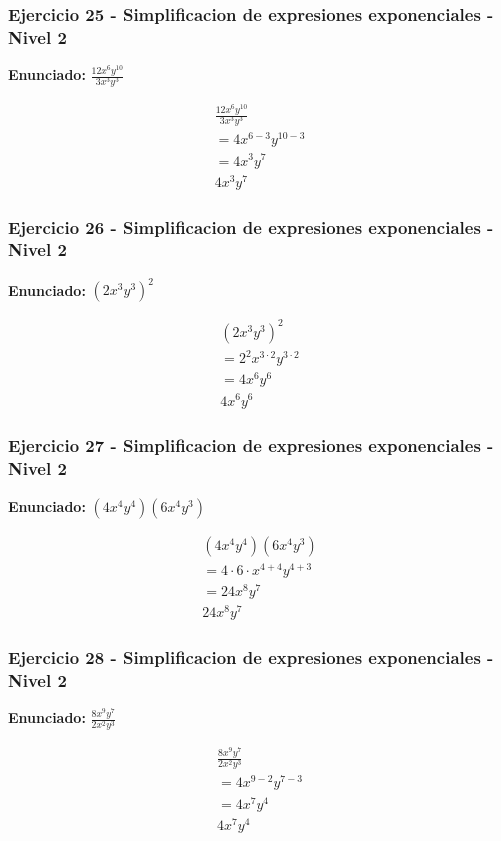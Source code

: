 \documentclass[12pt,a4paper]{article}
\begin{document}
\subsubsection*{Ejercicio 25 - Simplificacion de expresiones exponenciales - Nivel 2}
\textbf{Enunciado:} \(\frac{12x^{6}y^{10}}{3x^{3}y^{3}}\)

\[
\begin{aligned}
\frac{12x^{6}y^{10}}{3x^{3}y^{3}}\\
=4x^{6-3}y^{10-3}\\
=4x^{3}y^{7}\\
\boxed{4x^{3}y^{7}}
\end{aligned}
\]


\subsubsection*{Ejercicio 26 - Simplificacion de expresiones exponenciales - Nivel 2}
\textbf{Enunciado:} \(\left(2x^{3}y^{3}\right)^{2}\)

\[
\begin{aligned}
\left(2x^{3}y^{3}\right)^{2}\\
=2^{2}x^{3\cdot 2}y^{3\cdot 2}\\
=4x^{6}y^{6}\\
\boxed{4x^{6}y^{6}}
\end{aligned}
\]


\subsubsection*{Ejercicio 27 - Simplificacion de expresiones exponenciales - Nivel 2}
\textbf{Enunciado:} \((4x^{4}y^{4})(6x^{4}y^{3})\)

\[
\begin{aligned}
(4x^{4}y^{4})(6x^{4}y^{3})\\
=4\cdot 6\cdot x^{4+4}y^{4+3}\\
=24x^{8}y^{7}\\
\boxed{24x^{8}y^{7}}
\end{aligned}
\]


\subsubsection*{Ejercicio 28 - Simplificacion de expresiones exponenciales - Nivel 2}
\textbf{Enunciado:} \(\frac{8x^{9}y^{7}}{2x^{2}y^{3}}\)

\[
\begin{aligned}
\frac{8x^{9}y^{7}}{2x^{2}y^{3}}\\
=4x^{9-2}y^{7-3}\\
=4x^{7}y^{4}\\
\boxed{4x^{7}y^{4}}
\end{aligned}
\]
\end{document}
